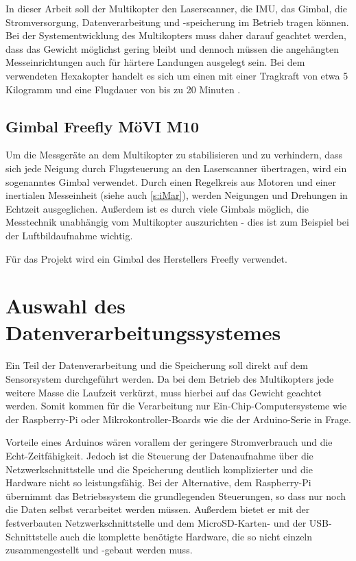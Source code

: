 \documentclass[a4paper,12pt,bibliography=totoc, listof=totoc,titlepage,pointlessnumbers]{scrreprt}
\begin{document}
In dieser Arbeit soll der Multikopter den Laserscanner, die IMU, das Gimbal, die Stromversorgung, Datenverarbeitung und -speicherung im Betrieb tragen können. Bei der Systementwicklung des Multikopters muss daher darauf geachtet werden, dass das Gewicht möglichst gering bleibt und dennoch müssen die angehängten Messeinrichtungen auch für härtere Landungen ausgelegt sein. Bei dem  verwendeten Hexakopter handelt es sich um einen  mit einer Tragkraft von etwa 5 Kilogramm und eine Flugdauer von bis zu 20 Minuten \citep{Schulz}.

\subsection{Gimbal Freefly MöVI M10}
Um die Messgeräte an dem Multikopter zu stabilisieren und zu verhindern, dass sich jede Neigung durch Flugsteuerung an den Laserscanner übertragen, wird ein sogenanntes Gimbal verwendet. Durch einen Regelkreis aus Motoren und einer inertialen Messeinheit (siehe auch \autoref{s:iMar}), werden Neigungen und Drehungen in Echtzeit ausgeglichen. Außerdem ist es durch viele Gimbals möglich, die Messtechnik unabhängig vom Multikopter auszurichten - dies ist zum Beispiel bei der Luftbildaufnahme wichtig.

Für das Projekt wird ein Gimbal des Herstellers Freefly verwendet. 


\section{Auswahl des Datenverarbeitungssystemes}

Ein Teil der Datenverarbeitung und die Speicherung soll direkt auf dem Sensorsystem durchgeführt werden. Da bei dem Betrieb des Multikopters jede weitere Masse die Laufzeit verkürzt, muss hierbei auf das Gewicht geachtet werden. Somit kommen für die Verarbeitung nur Ein-Chip-Computersysteme wie der Raspberry-Pi oder Mikrokontroller-Boards wie die der Arduino-Serie in Frage. 

Vorteile eines Arduinos wären vorallem der geringere Stromverbrauch und die Echt-Zeitfähigkeit. Jedoch ist die Steuerung der Datenaufnahme über die Netzwerkschnittstelle und die Speicherung deutlich komplizierter und die Hardware nicht so leistungsfähig. Bei der Alternative, dem Raspberry-Pi übernimmt das Betriebssystem die grundlegenden Steuerungen, so dass nur noch die Daten selbst verarbeitet werden müssen. Außerdem bietet er mit der festverbauten Netzwerkschnittstelle und dem MicroSD-Karten- und der USB-Schnittstelle auch die komplette benötigte Hardware, die so nicht einzeln zusammengestellt und -gebaut werden muss.
\end{document}
